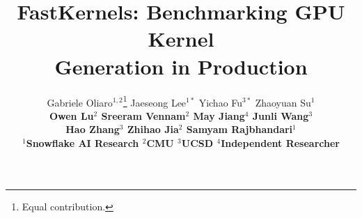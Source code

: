 \documentclass{article} %
\title{FastKernels: Benchmarking GPU Kernel\\Generation in Production}
\author{\ignorespaces
  Gabriele Oliaro$^{1,2}$\thanks{Equal contribution.} \quad
  Jaeseong Lee$^{1*}$ \quad
  Yichao Fu$^{3*}$ \quad
  Zhaoyuan Su$^{1}$ \\
  \bf
  Owen Lu$^{2}$ \quad
  Sreeram Vennam$^{2}$ \quad
  May Jiang$^{4}$ \quad
  Junli Wang$^{3}$ \\
  \bf
  Hao Zhang$^{3}$ \quad
  Zhihao Jia$^{2}$ \quad
  Samyam Rajbhandari$^{1}$ \\
  $^{1}$Snowflake AI Research \quad
  $^{2}$CMU \quad
  $^{3}$UCSD \quad
  $^{4}$Independent Researcher
}
\newif\ifpreprint
\begin{document}
\maketitle











\ificlrfinal
  \ifpreprint
  \else
    
  \fi
\else
  
\fi






\newpage
\appendix
\raggedbottom

\end{document}
